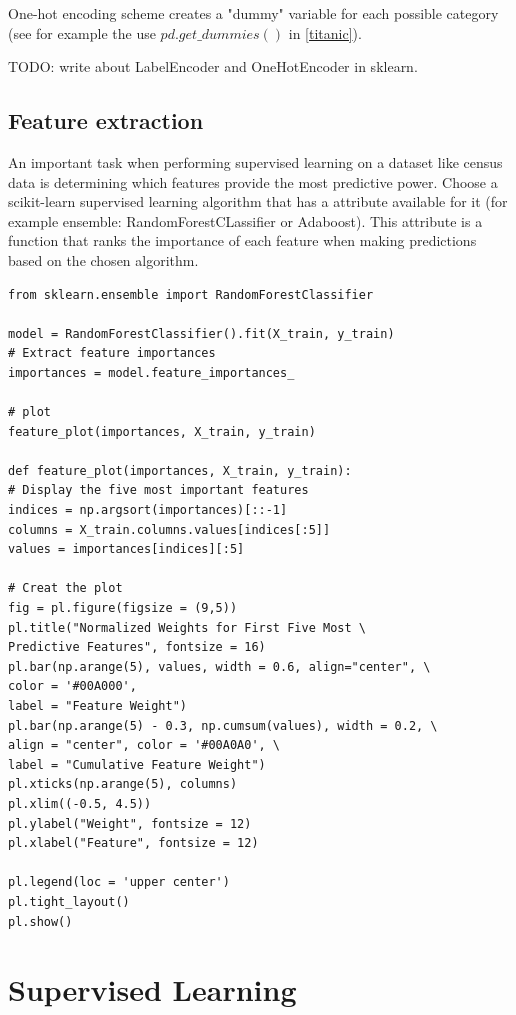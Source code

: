 \documentclass[11pt]{article}
\begin{document}
One-hot encoding scheme creates a "dummy" variable for each possible category (see for example the use $pd.get\_dummies()$ in \ref{titanic}). 

TODO: write about LabelEncoder  and OneHotEncoder in sklearn. 

\subsection{Feature extraction}
An important task when performing supervised learning on a dataset like census data is determining which features provide the most predictive power.
Choose a scikit-learn supervised learning algorithm that has a  attribute available for it (for example ensemble: RandomForestCLassifier or Adaboost). This attribute is a function that ranks the importance of each feature when making predictions based on the chosen algorithm.

\begin{lstlisting}
from sklearn.ensemble import RandomForestClassifier

model = RandomForestClassifier().fit(X_train, y_train)
# Extract feature importances 
importances = model.feature_importances_ 

# plot
feature_plot(importances, X_train, y_train)

def feature_plot(importances, X_train, y_train):
# Display the five most important features
indices = np.argsort(importances)[::-1]
columns = X_train.columns.values[indices[:5]]
values = importances[indices][:5]

# Creat the plot
fig = pl.figure(figsize = (9,5))
pl.title("Normalized Weights for First Five Most \
Predictive Features", fontsize = 16)
pl.bar(np.arange(5), values, width = 0.6, align="center", \ 
color = '#00A000', 
label = "Feature Weight")
pl.bar(np.arange(5) - 0.3, np.cumsum(values), width = 0.2, \
align = "center", color = '#00A0A0', \
label = "Cumulative Feature Weight")
pl.xticks(np.arange(5), columns)
pl.xlim((-0.5, 4.5))
pl.ylabel("Weight", fontsize = 12)
pl.xlabel("Feature", fontsize = 12)

pl.legend(loc = 'upper center')
pl.tight_layout()
pl.show()  
\end{lstlisting}


\section{Supervised Learning}
\end{document}
